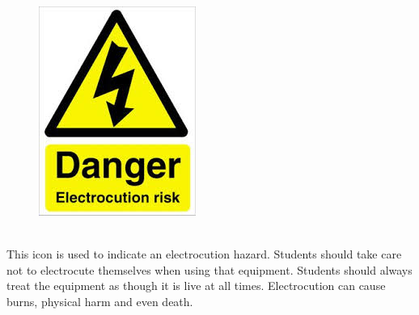 \documentclass[nohyper,nobib]{tufte-book}
\begin{document}
\begin{framed}
\begin{figure}
\includegraphics[width=\linewidth]{images/electrocution_hazard.jpg}
\end{figure}
\ \\
This icon is used to indicate an electrocution hazard.  Students should take care not to electrocute themselves when using that equipment.  Students should always treat the equipment as though it is live at all times.  Electrocution can cause burns, physical harm and even death.
\end{framed}
\end{document}
